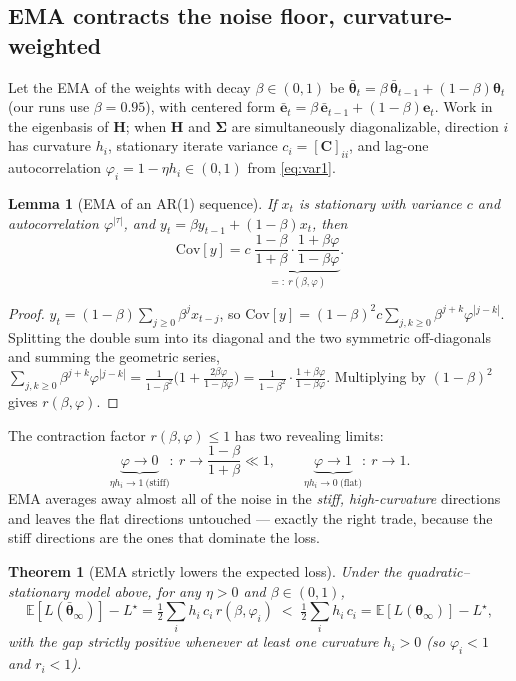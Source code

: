 \documentclass[11pt]{article}
\newtheorem{lemma}{Lemma}
\newtheorem{theorem}{Theorem}
\theoremstyle{remark}
\newcommand{\E}{\mathbb{E}}
\newcommand{\Cov}{\mathrm{Cov}}
\newcommand{\Hess}{\bm{H}}
\newcommand{\Sig}{\bm{\Sigma}}
\newcommand{\thetabar}{\bar{\bm\theta}}
\begin{document}
\subsection{EMA contracts the noise floor, curvature-weighted}

Let the EMA of the weights with decay $\beta\in(0,1)$ be
$\thetabar_t=\beta\,\thetabar_{t-1}+(1-\beta)\bm\theta_t$
(our runs use $\beta=0.95$), with centered form
$\bar{\bm e}_t=\beta\,\bar{\bm e}_{t-1}+(1-\beta)\bm e_t$.
Work in the eigenbasis of $\Hess$; when $\Hess$ and $\Sig$ are simultaneously
diagonalizable, direction $i$ has curvature $h_i$, stationary iterate variance
$c_i=[\bm C]_{ii}$, and lag-one autocorrelation $\varphi_i=1-\eta h_i\in(0,1)$
from \eqref{eq:var1}.

\begin{lemma}[EMA of an AR(1) sequence]
\label{lem:ar1}
If $x_t$ is stationary with variance $c$ and autocorrelation $\varphi^{|\tau|}$,
and $y_t=\beta y_{t-1}+(1-\beta)x_t$, then
\begin{equation}
\Cov[y]=c\;\underbrace{\frac{1-\beta}{1+\beta}\cdot
\frac{1+\beta\varphi}{1-\beta\varphi}}_{=:~r(\beta,\varphi)} .
\end{equation}
\end{lemma}

\begin{proof}
$y_t=(1-\beta)\sum_{j\ge0}\beta^j x_{t-j}$, so
$\Cov[y]=(1-\beta)^2 c\sum_{j,k\ge0}\beta^{j+k}\varphi^{|j-k|}$. Splitting the
double sum into its diagonal and the two symmetric off-diagonals and summing the
geometric series,
$\sum_{j,k\ge0}\beta^{j+k}\varphi^{|j-k|}
=\tfrac{1}{1-\beta^2}\bigl(1+\tfrac{2\beta\varphi}{1-\beta\varphi}\bigr)
=\tfrac{1}{1-\beta^2}\cdot\tfrac{1+\beta\varphi}{1-\beta\varphi}$.
Multiplying by $(1-\beta)^2$ gives $r(\beta,\varphi)$.
\end{proof}

The contraction factor $r(\beta,\varphi)\le 1$ has two revealing limits:
\begin{equation}
\underbrace{\varphi\to 0}_{\eta h_i\to 1~\text{(stiff)}}:~
r\to\frac{1-\beta}{1+\beta}\ll 1,
\qquad
\underbrace{\varphi\to 1}_{\eta h_i\to 0~\text{(flat)}}:~
r\to 1 .
\label{eq:limits}
\end{equation}
EMA averages away almost all of the noise in the \emph{stiff, high-curvature}
directions and leaves the flat directions untouched --- exactly the right
trade, because the stiff directions are the ones that dominate the loss.

\begin{theorem}[EMA strictly lowers the expected loss]
\label{thm:main}
Under the quadratic--stationary model above, for any $\eta>0$ and
$\beta\in(0,1)$,
\begin{equation}
\E[L(\thetabar_\infty)]-L^\star
=\tfrac12\sum_i h_i\,c_i\,r(\beta,\varphi_i)
\;<\;\tfrac12\sum_i h_i\,c_i
=\E[L(\bm\theta_\infty)]-L^\star ,
\end{equation}
with the gap strictly positive whenever at least one curvature $h_i>0$ (so
$\varphi_i<1$ and $r_i<1$).
\end{theorem}
\end{document}
